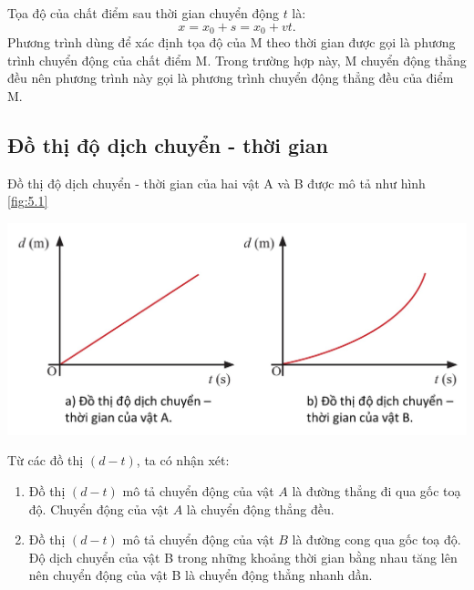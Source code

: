 Tọa độ của chất điểm sau thời gian chuyển động $t$ là:
\begin{equation}
x=x_0+s=x_0+vt.
\end{equation}
Phương trình dùng để xác định tọa độ của M theo thời gian được gọi là phương trình chuyển động của chất điểm M. Trong trường hợp này, M chuyển động thẳng đều nên phương trình này gọi là phương trình chuyển động thẳng đều của điểm M. 
\subsection{Đồ thị độ dịch chuyển - thời gian}
Đồ thị độ dịch chuyển - thời gian của hai vật A và B được mô tả như hình \ref{fig:5.1}
\begin{center}
	\includegraphics[width=0.6\linewidth]{../figs/VN10-2023-PH-TP005-1}
	\label{fig:5.1}
\end{center}
Từ các đồ thị $\left(d-t\right)$, ta có nhận xét:
\begin{enumerate}[label=\alph*)]
	\item Đồ thị $\left(d-t\right)$ mô tả chuyển động của vật $A$ là đường thẳng đi qua gốc toạ độ. Chuyển động của vật $A$ là chuyển động thẳng đều.
	\item Đồ thị $\left(d-t\right)$ mô tả chuyển động của vật $B$ là đường cong qua gốc toạ độ. Độ dịch chuyển của vật B trong những khoảng thời gian bằng nhau tăng lên nên chuyển động của vật B là chuyển động thẳng nhanh dần.
\end{enumerate}
